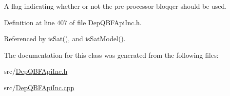 A flag indicating whether or not the pre-\/processor bloqqer should be used. 



Definition at line 407 of file Dep\-Q\-B\-F\-Api\-Inc.\-h.



Referenced by is\-Sat(), and is\-Sat\-Model().



The documentation for this class was generated from the following files\-:\begin{DoxyCompactItemize}
\item 
src/\hyperlink{DepQBFApiInc_8h}{Dep\-Q\-B\-F\-Api\-Inc.\-h}\item 
src/\hyperlink{DepQBFApiInc_8cpp}{Dep\-Q\-B\-F\-Api\-Inc.\-cpp}\end{DoxyCompactItemize}
